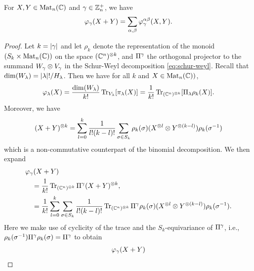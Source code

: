 \documentclass[notitlepage, 11pt, letterpaper]{amsart}
\begin{document}
\begin{thm}
    \label{thm:the_binomial_theorem}
    For $X,Y \in \operatorname{Mat}_n(\mathbb{C})$ and $\gamma \in \mathbb Z^{+}_{n}$, we have
    \begin{equation}
        \label{eq:varphi_sum_sum}
        \varphi_\gamma(X+Y)=\sum_{\alpha, \beta} \varphi^{\alpha \beta}_\gamma(X, Y).
    \end{equation}
\end{thm}
\begin{proof}
    Let $k=|\gamma|$ and let $\rho_k$ denote the representation of the monoid $(S_k \times \operatorname{Mat}_n(\mathbb{C}))$ on the space $(\mathbb{C}^n)^{\otimes k}$, and $\Pi^\gamma$ the orthogonal projector to the summand $W_\gamma \otimes V_\gamma$ in the Schur-Weyl decomposition \cref{eq:schur-weyl}.
    Recall that $\dim(W_{\lambda}) = |\lambda|! / H_{\lambda}$.
    Then we have for all $k$ and $X \in \operatorname{Mat}_n(\mathbb{C}))$,
    \begin{align}
        \begin{split}
            \varphi_{\lambda}(X)
            = \frac{\dim(W_{\lambda})}{k!} \operatorname{Tr}_{V_\lambda}[\pi_\lambda(X)]
            = \frac{1}{k!} \operatorname{Tr}_{(\mathbb{C}^n)^{\otimes k}}[\Pi_{\lambda} \rho_{k}(X)].
        \end{split}
    \end{align}
    Moreover, we have
    \begin{equation}
        (X+Y)^{\otimes k} = \sum_{l=0}^k \frac{1}{l!(k-l)!}\sum_{\sigma \in S_k} \rho_k(\sigma) (X^{\otimes l} \otimes Y^{\otimes (k-l)})\rho_k(\sigma^{-1})
    \end{equation}
    which is a non-commutative counterpart of the binomial decomposition.
    We then expand
    \begin{align}
        \begin{split}
            &\varphi_\gamma(X+Y) \\
            &\quad= \frac{1}{k!} \operatorname{Tr}_{(\mathbb{C}^n)^{\otimes k}} \Pi^\gamma  (X+Y)^{\otimes k}, \\
            &\quad= \frac{1}{k!}\sum_{l=0}^k \sum_{\sigma \in S_k} \frac{1}{l! (k-l)!} \operatorname{Tr}_{(\mathbb{C}^n)^{\otimes k}} \Pi^\gamma \rho_k(\sigma) (X^{\otimes l} \otimes Y^{\otimes (k-l)})\rho_k(\sigma^{-1}).
        \end{split}
    \end{align}
    Here we make use of cyclicity of the trace and the $S_k$-equivariance of $\Pi^{\gamma}$, i.e., $\rho_k(\sigma^{-1}) \Pi^\gamma \rho_k(\sigma) = \Pi^\gamma$ to obtain
    \begin{align}
        \begin{split}
            \vp_\yc(X+Y)

\end{split}
\end{align}
\end{proof}
\end{document}
